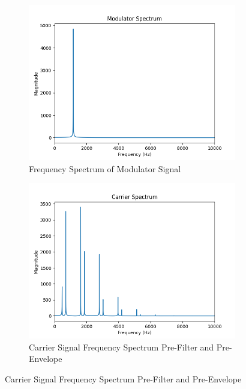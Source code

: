 \documentclass[11pt]{article}
\begin{document}
\begin{figure}[H]
    \centering
    \begin{subfigure}[b]{0.45\textwidth}
        \centering
        \includegraphics[width=\textwidth]{Modulator Spectrum.png}
        \caption{Frequency Spectrum of Modulator Signal}
        \label{fig:Mod Sign Freq Spec}
    \end{subfigure}
    \hfill
    \begin{subfigure}[b]{0.45\textwidth}
        \centering
        \includegraphics[width=\textwidth]{Carrier Spectrum(noenv and Filter).png}
        \caption{Carrier Signal Frequency Spectrum Pre-Filter and Pre-Envelope}
        \label{fig:Car Freq pre}
    \end{subfigure}

\end{figure}
\end{document}
